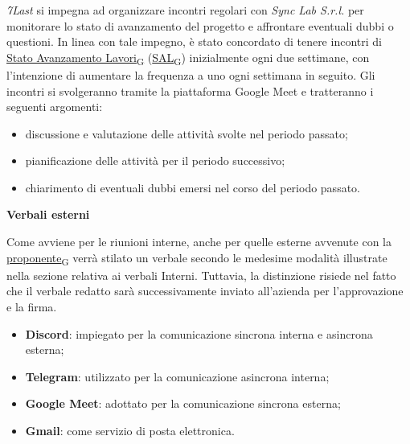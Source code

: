 \textit{7Last} si impegna ad organizzare incontri regolari con \textit{Sync Lab S.r.l.} per monitorare lo stato di avanzamento del progetto e affrontare eventuali dubbi o questioni. In linea con tale impegno, è stato concordato di tenere incontri di \href{https://7last.github.io/docs/rtb/documentazione-interna/glossario\#stato-avanzamento-lavori}{Stato Avanzamento Lavori\textsubscript{G}} (\href{https://7last.github.io/docs/rtb/documentazione-interna/glossario\#stato-avanzamento-lavori}{SAL\textsubscript{G}}) inizialmente ogni due settimane, con l'intenzione di aumentare la frequenza a uno ogni settimana in seguito. Gli incontri si svolgeranno tramite la piattaforma Google Meet e tratteranno i seguenti argomenti:
\begin{itemize}
    \item discussione e valutazione delle attività svolte nel periodo passato;
    \item pianificazione delle attività per il periodo successivo;
    \item chiarimento di eventuali dubbi emersi nel corso del periodo passato.
\end{itemize}
\begin{flushleft}
\textbf{Verbali esterni}
\end{flushleft}
Come avviene per le riunioni interne, anche per quelle esterne avvenute con la \href{https://7last.github.io/docs/rtb/documentazione-interna/glossario\#proponente}{proponente\textsubscript{G}} verrà stilato un verbale secondo le medesime modalità illustrate nella sezione relativa ai verbali Interni. Tuttavia, la distinzione risiede nel fatto che il verbale redatto sarà successivamente inviato all'azienda per l'approvazione e la firma.

\begin{itemize}
    \item \textbf{Discord}: impiegato per la comunicazione sincrona interna e asincrona esterna;
    \item \textbf{Telegram}: utilizzato per la comunicazione asincrona interna;
    \item \textbf{Google Meet}: adottato per la comunicazione sincrona esterna;
    \item \textbf{Gmail}: come servizio di posta elettronica.
\end{itemize}

